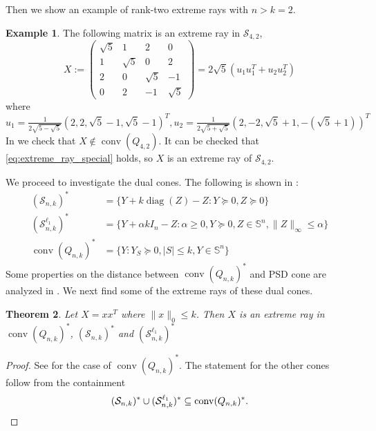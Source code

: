 \documentclass[11pt]{amsart}
\newcommand{\Szero}[2]{\ensuremath{\mathcal{S}_{#1,#2}}}
\newcommand{\Sone}[2]{\ensuremath{\mathcal{S}_{#1,#2}^{\ell_1}}}
\theoremstyle{plain}
\newtheorem{thm}{Theorem}[section]
\theoremstyle{definition}
\newtheorem{ex}[thm]
{Example}
\theoremstyle{remark}
\renewcommand{\SS}{{\mathbb{S}}}
\DeclareMathOperator{\conv}{conv}
\DeclareMathOperator{\diag}{diag}
\begin{document}
	Then we show an example of rank-two extreme rays with \(n>k=2\).
	
	\begin{ex}
		The following matrix is an extreme ray in \Szero{4}{2},
		\[
		X:= \left(\begin{smallmatrix}
			\sqrt{5} & 1 & 2& 0\\
			1 & \sqrt{5} & 0 & 2\\
			2 & 0 & \sqrt{5} & -1\\
			0 & 2 & -1 & \sqrt{5}
		\end{smallmatrix}\right)
        = 2\sqrt{5}(u_1u_1^T + u_2u_2^T)
		\]
		where 
        \small{
		\begin{equation}
				u_1 = \tfrac{1}{2\sqrt{5-\sqrt{5}}}(2, 2, \sqrt{5}-1, \sqrt{5}-1)^T,
				u_2 = \tfrac{1}{2\sqrt{5+\sqrt{5}}}(2, -2, \sqrt{5}+1, -(\sqrt{5}+1))^T
		\end{equation}
        }
		In  we check that \(X\notin \conv(Q_{4,2})\).
		It can be checked that \eqref{eq:extreme_ray_special} holds,
		so \(X\) is an extreme ray of \Szero{4}{2}.
	\end{ex}
	
	We proceed to investigate the dual cones. 
	The following is shown in :
	\begin{align}\label{eq:dualcone}
		(\Szero{n}{k})^* &= \{Y + k\diag(Z) - Z: Y \succeq 0, Z \succeq 0\}\\
		(\Sone{n}{k})^* &= \{Y + \alpha kI_n - Z: \alpha\geq 0, Y \succeq0, Z\in\SS^n, \|Z\|_\infty \leq \alpha\}\\
		\conv(Q_{n,k})^* &= \{Y: Y_{S}\succeq 0, |S|\leq k, Y\in\SS^n\}
	\end{align}
	Some properties on the distance between  $\conv(Q_{n,k})^*$ and PSD cone are analyzed in \cite{blekherman2022sparse,blekherman2022hyperbolic}.
	We next find some of the extreme rays of these dual cones.
	\begin{thm}\label{thm:extreme_ray_of_ourset_dual}
		Let \(X = xx^T\) where \(\|x\|_0 \leq k\).
		Then \(X\) is an extreme ray in \( \conv(Q_{n,k})^*\),
		\((\Szero{n}{k})^*\) and \((\Sone{n}{k})^*\)
	\end{thm}
	
	\begin{proof}
		See  for the case of \( \conv(Q_{n,k})^*\).
		The statement for the other cones follow from the containment
		\[
		(\Szero{n}{k})^* \cup  (\Sone{n}{k})^* \subseteq \conv(Q_{n,k})^*.\qedhere
		\]
	\end{proof}
	
\end{document}

